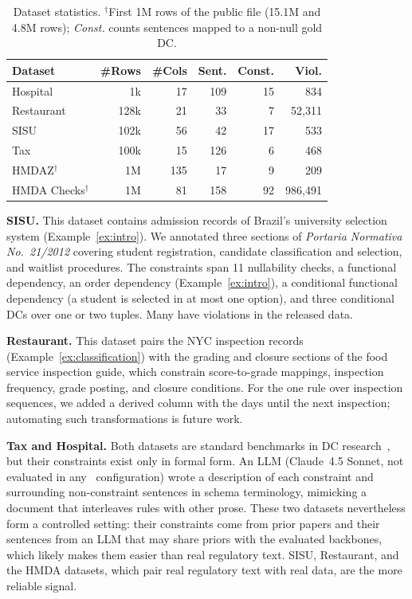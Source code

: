 \begin{table}[ht]
  \centering
\small
  \begin{tabular}{lrrrrr}
    \toprule
    \textbf{Dataset} & \textbf{\#Rows} & \textbf{\#Cols} & \textbf{Sent.} & \textbf{Const.} & \textbf{Viol.} \\
    \midrule
    Hospital & 1k & 17 & 109 & 15 & 834 \\
    Restaurant & 128k & 21 & 33 & 7 & 52,311 \\
    SISU & 102k & 56 & 42 & 17 & 533 \\
    Tax & 100k & 15 & 126 & 6 & 468 \\
    HMDAZ$^{\dagger}$ & 1M & 135 & 17 & 9 & 209 \\
    HMDA Checks$^{\dagger}$ & 1M & 81 & 158 & 92 & 986,491 \\
    \bottomrule
  \end{tabular}%
    \caption{Dataset statistics. $^{\dagger}$First 1M rows of the public file (15.1M and 4.8M rows); \emph{Const.} counts sentences mapped to a non-null gold DC.}
  \label{tab:datasets}
\end{table}

\smallskip\noindent\textbf{SISU.}
This dataset contains admission records of Brazil's university selection system (Example~\ref{ex:intro}). We annotated three sections of \textit{Portaria Normativa No.~21/2012} covering student
registration, candidate classification and selection, and waitlist procedures.
The constraints span 11 nullability checks, a functional dependency, an order dependency (Example~\ref{ex:intro}), a conditional functional dependency (a student is selected in at most one option), and three conditional DCs over one or two tuples. Many have violations in the released data.


\smallskip\noindent\textbf{Restaurant.}
This dataset pairs the NYC inspection records (Example~\ref{ex:classification}) with the grading and closure sections of the food service inspection guide, which constrain score-to-grade mappings, inspection frequency, grade posting, and closure conditions. For the one rule over inspection sequences, we added a derived column with the days until the next inspection; automating such transformations is future work.


\smallskip\noindent\textbf{Tax and Hospital.}
Both datasets are standard benchmarks in DC research~\cite{chu2013discovering,holoclean}, but their constraints exist only in formal form. An LLM (Claude~4.5 Sonnet, not evaluated in any \system\ configuration) wrote a description of each constraint and surrounding non-constraint sentences in schema terminology, mimicking a document that interleaves rules with other prose. These two datasets nevertheless form a controlled setting: their constraints come from prior papers and their sentences from an LLM that may share priors with the evaluated backbones, which likely makes them easier than real regulatory text. SISU, Restaurant, and the HMDA datasets, which pair real regulatory text with real data, are the more reliable signal.




